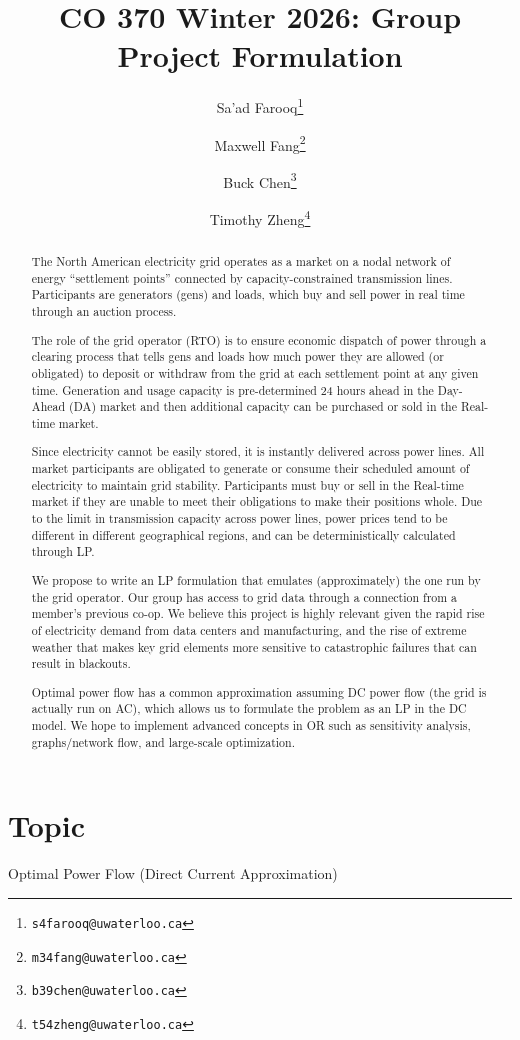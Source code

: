 \documentclass[11pt]{article}
\title{CO 370 Winter 2026: Group Project Formulation}
\author{
Sa'ad Farooq\thanks{\texttt{s4farooq@uwaterloo.ca}} \and
Maxwell Fang\thanks{\texttt{m34fang@uwaterloo.ca}} \and
Buck Chen\thanks{\texttt{b39chen@uwaterloo.ca}} \and
Timothy Zheng\thanks{\texttt{t54zheng@uwaterloo.ca}}
}
\begin{document}
\maketitle
\vspace{-1.75em}

\section{Topic}
\begin{center}
Optimal Power Flow (Direct Current Approximation)
\end{center}

\begin{abstract}
The North American electricity grid operates as a market on a nodal network of energy ``settlement points'' connected by capacity-constrained transmission lines. Participants are generators (gens) and loads, which buy and sell power in real time through an auction process.

The role of the grid operator (RTO) is to ensure economic dispatch of power through a clearing process that tells gens and loads how much power they are allowed (or obligated) to deposit or withdraw from the grid at each settlement point at any given time. Generation and usage capacity is pre-determined 24 hours ahead in the Day-Ahead (DA) market and then additional capacity can be purchased or sold in the Real-time market. 

Since electricity cannot be easily stored, it is instantly delivered across power lines. All market participants are obligated to generate or consume their scheduled amount of electricity to maintain grid stability. Participants must buy or sell in the Real-time market if they are unable to meet their obligations to make their positions whole. Due to the limit in transmission capacity across power lines, power prices tend to be different in different geographical regions, and can be deterministically calculated through LP. 

We propose to write an LP formulation that emulates (approximately) the one run by the grid operator. Our group has access to grid data through a connection from a member's previous co-op. We believe this project is highly relevant given the rapid rise of electricity demand from data centers and manufacturing, and the rise of extreme weather that makes key grid elements more sensitive to catastrophic failures that can result in blackouts.

Optimal power flow has a common approximation assuming DC power flow (the grid is actually run on AC), which allows us to formulate the problem as an LP in the DC model. We hope to implement advanced concepts in OR such as sensitivity analysis, graphs/network flow, and large-scale optimization.


\end{abstract}
\end{document}
